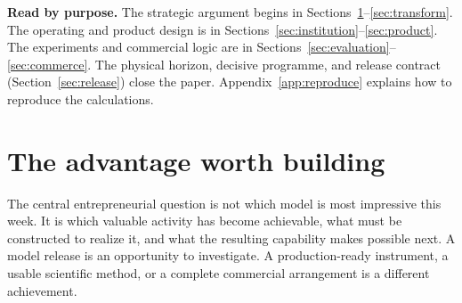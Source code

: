 \documentclass[11pt,letterpaper]{article}
\theoremstyle{remark}\newtheorem{remark}{Remark}[section]
\begin{document}
\begin{center}
\end{center}
\vspace{.2em}
\textbf{Read by purpose.} The strategic argument begins in Sections~\ref{sec:thesis}--\ref{sec:transform}. The operating and product design is in Sections~\ref{sec:institution}--\ref{sec:product}. The experiments and commercial logic are in Sections~\ref{sec:evaluation}--\ref{sec:commerce}. The physical horizon, decisive programme, and release contract (Section~\ref{sec:release}) close the paper. Appendix~\ref{app:reproduce} explains how to reproduce the calculations.
\clearpage
\tableofcontents

\clearpage
\section{The advantage worth building}
\label{sec:thesis}
The central entrepreneurial question is not which model is most impressive this week. It is which valuable activity has become achievable, what must be constructed to realize it, and what the resulting capability makes possible next. A model release is an opportunity to investigate. A production-ready instrument, a usable scientific method, or a complete commercial arrangement is a different achievement.
\end{document}
